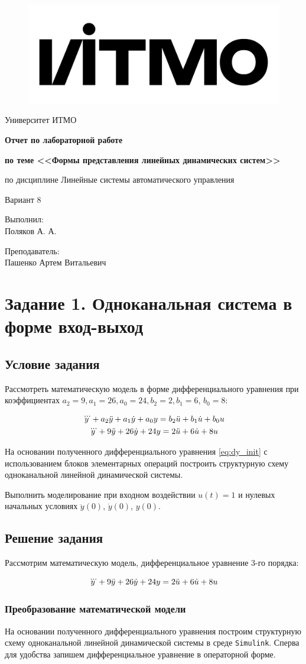 \documentclass[a4paper,14pt,oneside,openany]{article}
\theoremstyle{definition}
\theoremstyle{plain}
\theoremstyle{remark}
\newcommand*{\titlePage}{
	\thispagestyle{title}
	\begingroup
	\begin{center}
		\begin{figure}[h]
			\centering
			\includegraphics[width=0.2\linewidth]{./media/logo.jpg}
		\end{figure}
		
		Университет ИТМО
		
		\vspace*{15ex}


		{\Large \bfseries 
			Отчет по лабораторной работе
		}
\vspace*{2ex}
		
		{\Large \bfseries 
			по теме <<Формы представления линейных динамических систем>>
		}
\vspace*{2ex}
		
		{\Large
			по дисциплине Линейные системы автоматического управления
		}

\vspace*{2ex}
		{\Large
			Вариант 8
		}

	\end{center}
	\vspace*{18ex}
	\begin{flushright}
		{\large 
			Выполнил:\\
			Поляков А. А.\\                        
		}
		
		\vspace*{5ex}
		
		{\large 
			Преподаватель:\\
			Пашенко Артем Витальевич
		}
	\end{flushright}	
	\newpage
	\setcounter{page}{2}
	\endgroup
}
\begin{document}
\titlePage
\pagestyle{style}
\newpage

\tableofcontents* 


\section{Задание 1. Одноканальная система в форме вход-выход}
 
\subsection{Условие задания}

Рассмотреть математическую модель в форме дифференциального уравнения при коэффициентах 
$a_2 = 9, a_1 = 26, a_0 = 24, b_2 = 2, b_1 = 6$, $b _0 = 8$:

\begin{gather}
	\notag
	\dddot{y} + a_2\ddot{y} + a_1\dot{y} + a_0y = b_2\ddot{u} + b_1\dot{u} + b_0u\\
	\label{eq:dy_init}
	\dddot{y} + 9\ddot{y} + 26\dot{y} + 24y = 2\ddot{u} + 6\dot{u} + 8u
\end{gather}

На основании полученного дифференциального уравнения \eqref{eq:dy_init} с использованием блоков элементарных 
операций построить структурную схему одноканальной линейной динамической системы.

Выполнить моделирование при входном воздействии $u(t) = 1$ и нулевых начальных условиях 
$\ddot{y}(0)$, $\dot{y}(0)$, $y(0)$.

\subsection{Решение задания}

Рассмотрим математическую модель, дифференциальное уравнение 3-го порядка:

\begin{equation}
	\notag
	\dddot{y} + 9\ddot{y} + 26\dot{y} + 24y = 2\ddot{u} + 6\dot{u} + 8u
\end{equation}

\subsubsection{Преобразование математической модели}

На основании полученного дифференциального уравнения построим структурную схему одноканальной 
линейной динамической системы в среде \texttt{Simulink}. Сперва для удобства запишем дифференциальное 
уравнение в операторной форме. 
\end{document}
